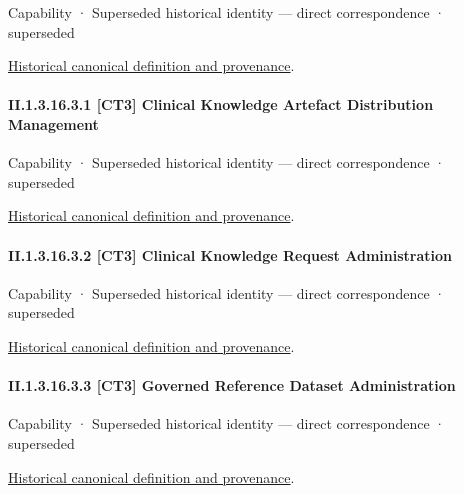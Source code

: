 \label{element:5b8478b08c3f42c0a3480edb8f0b9ea7}
{\small Capability · Superseded historical identity — direct correspondence · superseded}\par
\href{../../../../continuum/strategy/capability/5b8478b08c3f42c0a3480edb8f0b9ea7.md}{Historical canonical definition and provenance}.\par
\paragraph*{II.1.3.16.3.1 [CT3] Clinical Knowledge Artefact Distribution Management}
\label{navigation:II.1.3.16.3.1}

\label{element:d81e0d6d76014066a682e3d9e03e5f8a}
{\small Capability · Superseded historical identity — direct correspondence · superseded}\par
\href{../../../../continuum/strategy/capability/d81e0d6d76014066a682e3d9e03e5f8a.md}{Historical canonical definition and provenance}.\par
\paragraph*{II.1.3.16.3.2 [CT3] Clinical Knowledge Request Administration}
\label{navigation:II.1.3.16.3.2}

\label{element:eb370c01fbdb4d22956d97e9ecd74b57}
{\small Capability · Superseded historical identity — direct correspondence · superseded}\par
\href{../../../../continuum/strategy/capability/eb370c01fbdb4d22956d97e9ecd74b57.md}{Historical canonical definition and provenance}.\par
\paragraph*{II.1.3.16.3.3 [CT3] Governed Reference Dataset Administration}
\label{navigation:II.1.3.16.3.3}

\label{element:15d972931ed6447797c30a5ddb71737e}
{\small Capability · Superseded historical identity — direct correspondence · superseded}\par
\href{../../../../continuum/strategy/capability/15d972931ed6447797c30a5ddb71737e.md}{Historical canonical definition and provenance}.\par
